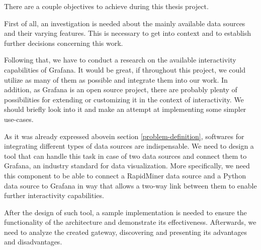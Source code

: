 

There are a couple objectives to achieve during this thesis project.

First of all, an investigation is needed about the mainly available data sources and their varying features. This is necessary to get into context and to establish further decisions concerning this work.

Following that, we have to conduct a research on the available interactivity capabilities of Grafana. It would be great, if throughout this project, we could utilize as many of them as possible and integrate them into our work. In addition, as Grafana is an open source project, there are probably plenty of possibilities for extending or customizing it in the context of interactivity. We should briefly look into it and make an attempt at implementing some simpler use-cases.

As it was already expressed abovein section \ref{problem-definition}, softwares for integrating different types of data sources are indispensable. We need to design a tool that can handle this task in case of two data sources and connect them to Grafana, an industry standard for data visualization. More specifically, we need this component to be able to connect a RapidMiner data source and a Python data source to Grafana in way that allows a two-way link between them to enable further interactivity capabilities.

After the design of such tool, a sample implementation is needed to ensure the functionality of the architecture and demonstrate its effectiveness. Afterwards, we need to analyze the created gateway, discovering and presenting its advantages and disadvantages.







